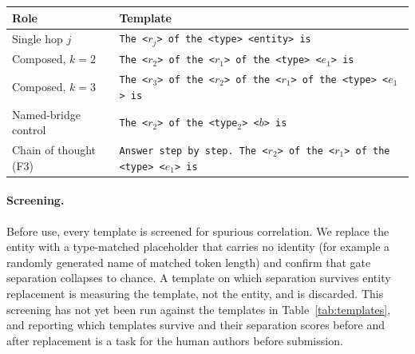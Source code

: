 \documentclass{article}
\begin{document}
\begin{center}
\small
{}
\label{tab:templates}
\vspace{1pt}
\begin{tabular}{@{}lp{9.4cm}@{}}
\toprule
\textbf{Role} & \textbf{Template}\\
\midrule
Single hop $j$ & \texttt{The <$r_j$> of the <type> <entity> is}\\
Composed, $k{=}2$ & \texttt{The <$r_2$> of the <$r_1$> of the <type> <$e_1$> is}\\
Composed, $k{=}3$ & \texttt{The <$r_3$> of the <$r_2$> of the <$r_1$> of the <type> <$e_1$> is}\\
Named-bridge control & \texttt{The <$r_2$> of the <type$_2$> <$b$> is}\\
Chain of thought (F3) & \texttt{Answer step by step. The <$r_2$> of the <$r_1$> of the <type>
<$e_1$> is}\\
\bottomrule
\end{tabular}
\vspace{-1.15em}
\end{center}

\paragraph{Screening.} Before use, every template is screened for spurious correlation. We replace
the entity with a type-matched placeholder that carries no identity (for example a randomly generated
name of matched token length) and confirm that gate separation collapses to chance. A template on
which separation survives entity replacement is measuring the template, not the entity, and is
discarded. This screening has not yet been run against the templates in Table~\ref{tab:templates}, and
reporting which templates survive and their separation scores before and after replacement is a
task for the human authors before submission.
\end{document}
